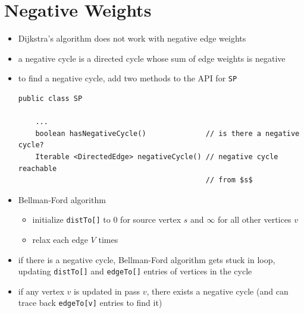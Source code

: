 \documentclass[8pt,a4paper,compress]{beamer}
\begin{document}
\section{Negative Weights}
\begin{frame}[fragile]
\begin{itemize}
\item Dijkstra's algorithm does not work with negative edge weights

\item a negative cycle is a directed cycle whose sum of edge weights is
negative

\item to find a negative cycle, add two methods to the API for \lstinline{SP}
\begin{lstlisting}[language={},mathescape]
public class SP

    ...
    boolean hasNegativeCycle()              // is there a negative cycle?
    Iterable <DirectedEdge> negativeCycle() // negative cycle reachable 
                                            // from $s$
\end{lstlisting}

\item Bellman-Ford algorithm
\begin{itemize}
\item initialize \lstinline{distTo[]} to 0 for source vertex $s$ and $\infty$ for all other vertices $v$
\item relax each edge $V$ times
\end{itemize}

\item if there is a negative cycle, Bellman-Ford algorithm gets stuck in loop,
updating \lstinline{distTo[]} and \lstinline{edgeTo[]} entries of vertices in the cycle

\item if any vertex $v$ is updated in pass $v$, there exists a negative
cycle (and can trace back \lstinline{edgeTo[v]} entries to find it)
\end{itemize}
\end{frame}
\end{document}
